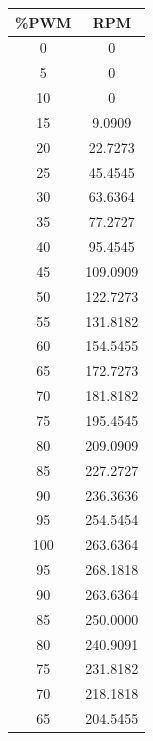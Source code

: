                \begin{table}[h!]
                    \centering
                    \begin{tabular}{|c|c|}
                         \hline
                         \textbf{\%PWM} & \textbf{RPM} \\
                         \hline
                         0 & 0 \\
                         5 & 0 \\
                         10 & 0 \\
                         15 & 9.0909 \\
                         20 & 22.7273 \\
                         25 & 45.4545 \\
                         30 & 63.6364 \\
                         35 & 77.2727 \\
                         40 & 95.4545 \\
                         45 & 109.0909 \\
                         50 & 122.7273 \\
                         55 & 131.8182 \\
                         60 & 154.5455 \\
                         65 & 172.7273 \\
                         70 & 181.8182 \\
                         75 & 195.4545 \\
                         80 & 209.0909 \\
                         85 & 227.2727 \\
                         90 & 236.3636 \\
                         95 & 254.5454 \\
                         100 & 263.6364 \\
                         95 & 268.1818 \\
                         90 & 263.6364 \\
                         85 & 250.0000 \\
                         80 & 240.9091 \\
                         75 & 231.8182 \\
                         70 & 218.1818 \\
                         65 & 204.5455 \\

\end{tabular}
\end{table}
